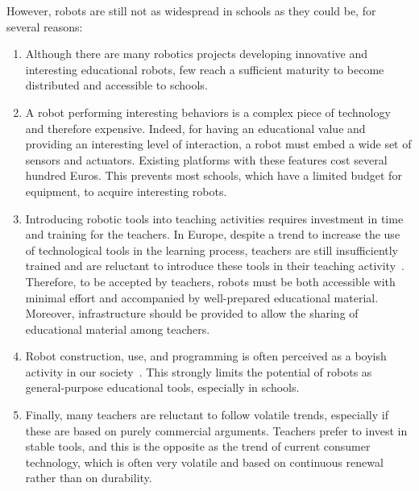 \documentclass[letterpaper, 10 pt, conference]{ieeeconf}  %
\begin{document}
However, robots are still not as widespread in schools as they could be, for several reasons:
\begin{enumerate}
\item Although there are many robotics projects developing innovative and interesting educational robots, few reach a sufficient maturity to become distributed and accessible to schools. 
\item A robot performing interesting behaviors is a complex piece of technology and therefore expensive. 
Indeed, for having an educational value and providing an interesting level of interaction, a robot must embed a wide set of sensors and actuators.
Existing platforms with these features cost several hundred Euros.
This prevents most schools, which have a limited budget for equipment, to acquire interesting robots.
\item Introducing robotic tools into teaching activities requires investment in time and training for the teachers.
In Europe, despite a trend to increase the use of technological tools in the learning process, teachers are still insufficiently trained and are reluctant to introduce these tools in their teaching activity~\cite{CERI2008}.
Therefore, to be accepted by teachers, robots must be both accessible with minimal effort and accompanied by well-prepared educational material. 
Moreover, infrastructure should be provided to allow the sharing of educational material among teachers.
\item Robot construction, use, and programming is often perceived as a boyish activity in our society~\cite{leonard2009lego,nourbakhsh2009robot}.
This strongly limits the potential of robots as general-purpose educational tools, especially in schools.
\item Finally, many teachers are reluctant to follow volatile trends, especially if these are based on purely commercial arguments.
Teachers prefer to invest in stable tools, and this is the opposite as the trend of current consumer technology, which is often very volatile and based on continuous renewal rather than on durability.
\end{enumerate}
\end{document}
